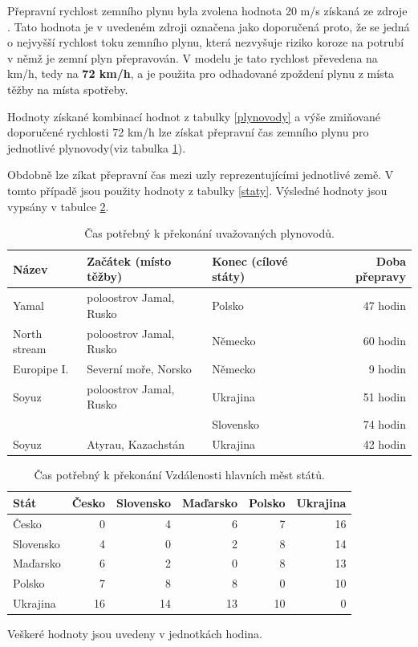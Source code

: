 \documentclass[a4paper,11pt]{article}
\begin{document}

Přepravní rychlost zemního plynu byla zvolena hodnota 20 m/s získaná ze zdroje
\cite{engineering}.
Tato hodnota je v uvedeném zdroji označena jako doporučená 
proto, že se jedná o nejvyšší rychlost toku zemního plynu,
která nezvyšuje riziko koroze na  potrubí v němž je zemní plyn přepravován.
V modelu je tato rychlost převedena na km/h, tedy na \textbf{72 km/h}, a je použita pro
odhadované zpoždení plynu z místa těžby na místa spotřeby.

Hodnoty získané kombinací hodnot z tabulky \ref{plynovody} a výše zmiňované
doporučené rychlosti 72 km/h lze získat přepravní čas zemního plynu pro jednotlivé
plynovody(viz tabulka \ref{plynovodyprevod}).

Obdobně lze zíkat přepravní čas mezi uzly reprezentujícími jednotlivé země.
V tomto případě jsou použity hodnoty z tabulky \ref{staty}. 
Výsledné hodnoty jsou vypsány v tabulce  \ref{statyprevod}.

\begin{table}[h!]
\begin{center}
\begin{tabular}{|l|l|l|r|}
    \hline
    Název 			& Začátek (místo těžby)	& Konec (cílové státy) 		& Doba přepravy \\
    \hline 
    Yamal			& poloostrov Jamal, Rusko & Polsko				& 47 hodin\\ 
    North stream 	& poloostrov Jamal, Rusko & Německo			& 60 hodin\\
    Europipe I. 		& Severní moře, Norsko 	& Německo  			& 9 hodin\\
    Soyuz 			& poloostrov Jamal, Rusko & Ukrajina 			& 51 hodin\\
					&						& Slovensko			& 74 hodin\\ 
	Soyuz 			& Atyrau, Kazachstán	 	& Ukrajina			& 42 hodin\\	
    \hline
\end{tabular}
\caption{Čas potřebný k překonání uvažovaných plynovodů.} 
\label{plynovodyprevod}
\end{center}
\end{table}


\begin{table}[h!]
\begin{center}
\begin{tabular}{|l|r|r|r|r|r|}
    \hline
    Stát 			& Česko		& Slovensko 		& Maďarsko	& Polsko & Ukrajina\\
    \hline 
    Česko			& 0 			& 4 				& 6			& 7		 & 16\\ 
    Slovensko 		& 4			& 0				& 2			& 8		 & 14\\
    Maďarsko 		& 6			& 2				& 0			& 8		 & 13\\
    Polsko 			& 7			& 8				& 8		 	& 0		 & 10\\
	Ukrajina			& 16			& 14				& 13			& 10		 & 0\\
    \hline
\end{tabular}
\caption{Čas potřebný k překonání Vzdálenosti hlavních měst států.}
Veškeré hodnoty jsou uvedeny v jednotkách hodina.
\label{statyprevod}
\end{center}
\end{table}
\end{document}
